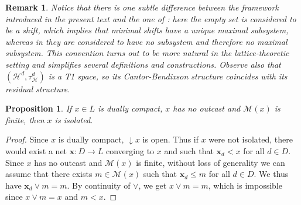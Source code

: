 \documentclass{article}
\newtheorem{proposition}[theorem]{Proposition}
\newtheorem{remark}[theorem]{Remark}
\begin{document}


\begin{remark}
Notice that there is one subtle difference between the framework introduced in the present text and the one of \cite{GN25}: here the empty set is considered to be a shift, which implies that minimal shifts have a unique maximal subsystem, whereas in \cite{GN25} they are considered to have no subsystem and therefore no maximal subsystem. This convention turns out to be more natural in the lattice-theoretic setting and simplifies several definitions and constructions. Observe also that $(\mathcal{H}^d,\tau_{\mathcal{H}}^d)$ is a T1 space, so its Cantor-Bendixson structure coincides with its residual structure.
\end{remark}


\begin{proposition}\label{prop.no.outcast}
    If $x \in L$ is dually compact, $x$ has no outcast and $\mathcal{M}(x)$ is finite, then $x$ is isolated. 
\end{proposition}

\begin{proof}
    {Since $x$ is dually compact, $\mathop{\downarrow}x$ is open. Thus if $x$ were not isolated, there would exist a net $\boldsymbol{x} : D \rightarrow L$ converging to $x$ and such that $\boldsymbol{x}_d < x$ for all $d \in D$. Since $x$ has no outcast and $\mathcal{M}(x)$ is finite, without loss of generality we can assume that there exists $m \in \mathcal{M}(x)$ such that $\boldsymbol{x}_d \le m$ for all $d \in D$. We thus have 
    $\boldsymbol{x}_d \vee m = m$. 
    By continuity of $\vee$, we get $x \vee m = m$, which is impossible since $x \vee m = x$ and $m < x$.}
\end{proof}
\end{document}
